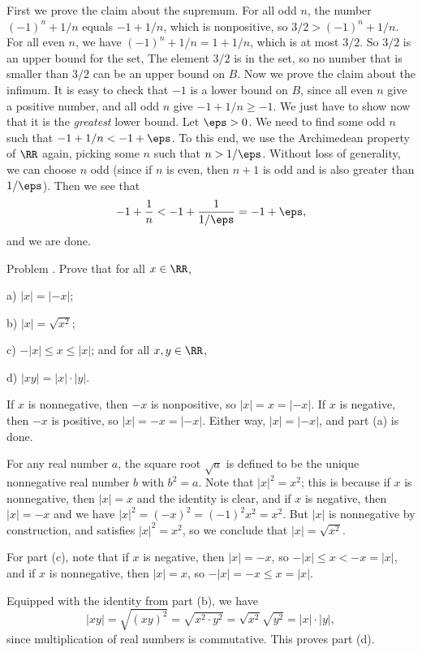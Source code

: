 First we prove the claim about the supremum. For all odd $n$,
the number $(-1)^n + 1/n$ equals $-1 + 1/n$, which is nonpositive, so $3/2 > (-1)^n + 1/n$. For all
even $n$, we have $(-1)^n + 1/n = 1+1/n$, which is at most $3/2$. So $3/2$ is an upper bound for the set,
The element $3/2$ is in the set, so no number that is smaller than $3/2$ can be an upper bound on $B$.
Now we prove the claim about the infimum. It is easy to check that $-1$ is a lower bound on $B$, since
all even $n$ give a positive number, and all odd $n$ give $-1+1/n \ge -1$. We just have to show
now that it is the {\it greatest} lower bound. Let $\eps > 0$. We need to find some odd $n$
such that $-1 + 1/n < -1 + \eps$. To this end, we use the Archimedean property of $\RR$ again,
picking some $n$ such that $n > 1/\eps$. Without loss of generality, we can choose $n$ odd (since
if $n$ is even, then $n+1$ is odd and is also greater than $1/\eps$). Then we see that
$$-1 + {1\over n} < -1 + {1\over 1/\eps} = -1+\eps,$$
and we are done.\slug

\proclaim Problem \advthm. Prove that for all $x\in \RR$,
\medskip
\item{a)} $|x| = |-x|$;
\smallskip
\item{b)} $|x| = \sqrt{x^2}$;
\smallskip
\item{c)} $-|x| \le x \le |x|$;
\medskip
\noindent and for all $x,y\in \RR$,
\medskip
\item{d)} $|xy| = |x|\cdot |y|$.
\medskip

\proof If $x$ is nonnegative, then $-x$ is nonpositive, so $|x| = x = |-x|$.
If $x$ is negative, then $-x$ is positive, so $|x| = -x = |-x|$. Either way, $|x| = |-x|$,
and part (a) is done.

For any real number $a$, the square root $\sqrt a$ is defined to be the unique nonnegative real number
$b$ with $b^2 = a$. Note that $|x|^2 = x^2$; this is because if $x$ is nonnegative, then $|x| = x$
and the identity is clear, and if $x$ is negative, then $|x| = -x$ and we have $|x|^2 = (-x)^2
= (-1)^2 x^2 = x^2$. But $|x|$ is nonnegative by construction, and satisfies $|x|^2 = x^2$,
so we conclude that $|x| = \sqrt{x^2}$.

For part (c), note that if $x$ is negative, then $|x| = -x$, so $-|x|\le x < -x = |x|$, and if
$x$ is nonnegative, then $|x| = x$, so $-|x| = -x \le x = |x|$.

Equipped with the identity from part (b), we have
$$|xy| = \sqrt{(xy)^2} = \sqrt{x^2\cdot y^2} = \sqrt{x^2}\sqrt{y^2} = |x|\cdot |y|,$$
since multiplication of real numbers is commutative. This proves part (d).\slug

